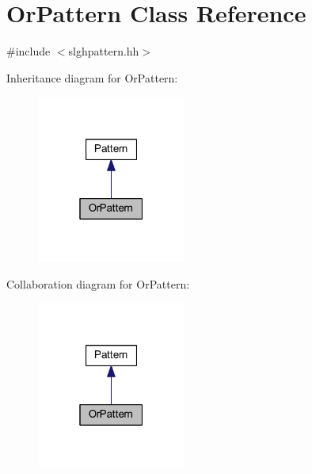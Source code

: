 \hypertarget{class_or_pattern}{}\section{Or\+Pattern Class Reference}
\label{class_or_pattern}


{\ttfamily \#include $<$slghpattern.\+hh$>$}



Inheritance diagram for Or\+Pattern\+:
\nopagebreak
\begin{figure}[H]
\begin{center}
\leavevmode
\includegraphics[width=139pt]{class_or_pattern__inherit__graph}
\end{center}
\end{figure}


Collaboration diagram for Or\+Pattern\+:
\nopagebreak
\begin{figure}[H]
\begin{center}
\leavevmode
\includegraphics[width=139pt]{class_or_pattern__coll__graph}
\end{center}
\end{figure}
